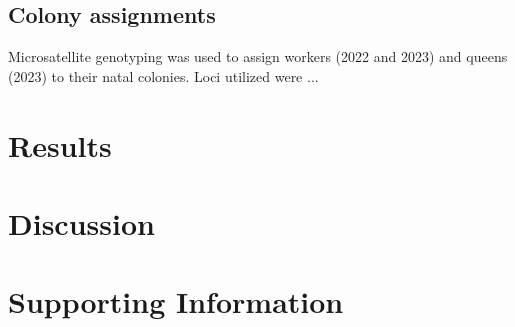 \documentclass[12pt]{article}
\begin{document}
\subsection{Colony assignments}
Microsatellite genotyping was used to assign workers (2022 and 2023) and queens (2023) to their natal colonies. Loci utilized were ...



\section{Results}
\section{Discussion}

\printbibliography
\clearpage




\section*{Supporting Information}

\setcounter{figure}{0}
\setcounter{table}{0}


%
\end{document}
